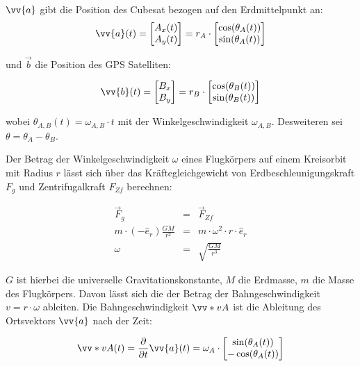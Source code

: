 $\vv{a}$ gibt die Position des Cubesat bezogen auf den Erdmittelpunkt an:
\begin{equation}
    \vv{a}(t)=\begin{bmatrix} 
        A_x(t)\\ 
        A_y(t) 
    \end{bmatrix} = 
    r_A \cdot \begin{bmatrix} 
        \cos(\theta_A(t))\\ 
        \sin(\theta_A(t)) 
    \end{bmatrix}
\end{equation}

und $\vec{b}$ die Position des GPS Satelliten:

\begin{equation}
    \vv{b}(t)=\begin{bmatrix} 
        B_x\\ 
        B_y 
    \end{bmatrix} = 
    r_B \cdot \begin{bmatrix} 
        \cos(\theta_B(t))\\ 
        \sin(\theta_B(t)) 
    \end{bmatrix}
\end{equation}

wobei $\theta_{A,B}(t)=\omega_{A,B} \cdot t$ mit der Winkelgeschwindigkeit $\omega_{A,B}$. Desweiteren sei $\theta = \theta_A - \theta_B$.

Der Betrag der Winkelgeschwindigkeit $\omega$ eines Flugkörpers auf einem Kreisorbit mit Radius $r$ lässt sich über das Kräftegleichgewicht von Erdbeschleunigungskraft $F_g$ und Zentrifugalkraft $F_{Zf}$ berechnen:

\begin{eqnarray}
    \vec{F}_g &=& \vec{F}_{Zf} \\
    m \cdot (-\hat{e}_r) \frac{G M}{r^2} &=& m \cdot \omega^2 \cdot r \cdot \hat{e}_r\\
    \omega &=& \sqrt{\frac{G M}{r^3}}
\end{eqnarray}

$G$ ist hierbei die universelle Gravitationskonstante, $M$ die Erdmasse, $m$ die Masse des Flugkörpers. Davon lässt sich die der Betrag der Bahngeschwindigkeit $v=r \cdot \omega$ ableiten. Die Bahngeschwindigkeit $\vv*{v}{A}$ ist die Ableitung des Ortsvektors $\vv{a}$ nach der Zeit:

\begin{equation}
    \vv*{v}{A}(t)=\frac{\partial}{\partial t}\vv{a}(t)
    = \omega_A \cdot \begin{bmatrix} 
        \sin(\theta_A(t))\\ 
        -\cos(\theta_A(t)) 
    \end{bmatrix}
\end{equation}

